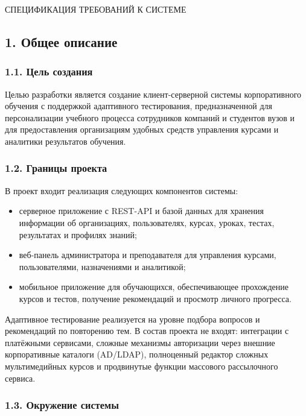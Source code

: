 \documentclass{G7-32}
\begin{document}

\newpage
\begin{center}
{\fontsize{14pt}{21pt}\selectfont\MakeUppercase{Спецификация требований к системе}\par}
\end{center}

\subsection*{1. Общее описание}

\subsubsection*{1.1. Цель создания}

Целью разработки является создание клиент-серверной системы корпоративного обучения с поддержкой адаптивного тестирования, предназначенной для персонализации учебного процесса сотрудников компаний и студентов вузов и для предоставления организациям удобных средств управления курсами и аналитики результатов обучения.

\subsubsection*{1.2. Границы проекта}

В проект входит реализация следующих компонентов системы:
\begin{itemize}
  \item серверное приложение с REST-API и базой данных для хранения информации об организациях, пользователях, курсах, уроках, тестах, результатах и профилях знаний;
  \item веб-панель администратора и преподавателя для управления курсами, пользователями, назначениями и аналитикой;
  \item мобильное приложение для обучающихся, обеспечивающее прохождение курсов и тестов, получение рекомендаций и просмотр личного прогресса.
\end{itemize}

Адаптивное тестирование реализуется на уровне подбора вопросов и рекомендаций по повторению тем.  
В состав проекта не входят: интеграции с платёжными сервисами, сложные механизмы авторизации через внешние корпоративные каталоги (AD/LDAP), полноценный редактор сложных мультимедийных курсов и продвинутые функции массового рассылочного сервиса.

\subsubsection*{1.3. Окружение системы}
\end{document}
